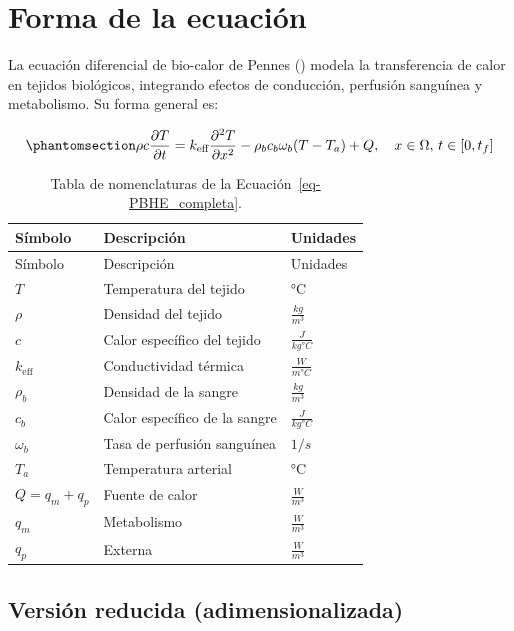 \documentclass[
  spanish,
  us-letterpaper,
  DIV=11,
  numbers=noendperiod]{scrreprt}
\theoremstyle{plain}
\theoremstyle{definition}
\theoremstyle{remark}
\begin{document}
\chapter{Forma de la ecuación}\label{forma-de-la-ecuaciuxf3n}

La ecuación diferencial de bio-calor de Pennes
() modela la transferencia de calor en
tejidos biológicos, integrando efectos de conducción, perfusión
sanguínea y metabolismo. Su forma general es:

\begin{equation}\phantomsection\label{eq-PBHE_completa}{
\rho c \frac{\partial T}{\partial t} = k_{\text{eff}} \frac{\partial^{2} T}{\partial x^{2}} - \rho_b c_b \omega_b (T - T_a) + Q, \quad x \in \Omega, \, t \in [0, t_f]
}\end{equation}

\begin{longtable}[]{@{}lll@{}}
\caption{Tabla de nomenclaturas de la
Ecuación~\ref{eq-PBHE_completa}.}\label{tbl-nomenclatura-PBHE_completa}\tabularnewline
\toprule\noalign{}
Símbolo & Descripción & Unidades \\
\midrule\noalign{}
\endfirsthead
\toprule\noalign{}
Símbolo & Descripción & Unidades \\
\midrule\noalign{}
\endhead
\bottomrule\noalign{}
\endlastfoot
\(T\) & Temperatura del tejido & °C \\
\(\rho\) & Densidad del tejido & \(\frac{kg}{m^3}\) \\
\(c\) & Calor específico del tejido & \(\frac{J}{kg °C}\) \\
\(k_{\text{eff}}\) & Conductividad térmica & \(\frac{W}{m °C}\) \\
\(\rho_b\) & Densidad de la sangre & \(\frac{kg}{m^3}\) \\
\(c_b\) & Calor específico de la sangre & \(\frac{J}{kg °C}\) \\
\(\omega_b\) & Tasa de perfusión sanguínea & \(1/s\) \\
\(T_a\) & Temperatura arterial & °C \\
\(Q = q_m + q_p\) & Fuente de calor & \(\frac{W}{m^3}\) \\
\(q_m\) & Metabolismo & \(\frac{W}{m^3}\) \\
\(q_p\) & Externa & \(\frac{W}{m^3}\) \\
\end{longtable}

\section{Versión reducida
(adimensionalizada)}\label{versiuxf3n-reducida-adimensionalizada}
\end{document}
